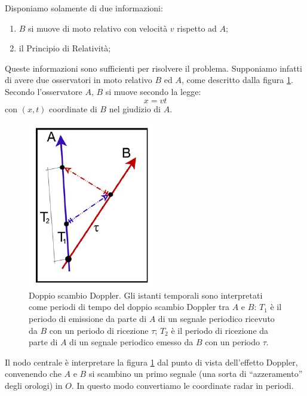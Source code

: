 Disponiamo solamente di due informazioni:
\begin{enumerate}
 \item $B$ si muove di moto relativo con velocità $v$ rispetto ad $A$;
 \item il Principio di Relatività;
\end{enumerate}
Queste informazioni sono sufficienti per risolvere il problema. 
Supponiamo infatti di avere due osservatori in moto relativo $B$ ed 
$A$, come descritto dalla figura \ref{doppler}. Secondo l'osservatore
$A$, $B$ si muove secondo la legge:
\begin{equation}\label{moto_relativo}
x=vt 
\end{equation}
con $(x, t)$ coordinate di $B$ nel giudizio di $A$.

\begin{figure}[htbp]
   \centering
   \includegraphics[scale=1]{immagini/minkowski/doppler}
   \caption{\label{doppler} Doppio scambio Doppler. Gli istanti temporali 
sono interpretati come periodi di tempo del doppio scambio Doppler
tra $A$ e $B$: $T_1$ è il periodo di emissione da parte di $A$ di un segnale periodico
ricevuto da $B$ con un periodo di ricezione $\tau$; $T_2$ è il periodo di ricezione da
parte di $A$ di un segnale periodico emesso da $B$ con un periodo $\tau$.}
\end{figure}

Il nodo centrale è interpretare la figura \ref{doppler} dal punto di vista dell'effetto
Doppler, convenendo che $A$ e $B$ si scambino un primo segnale (una sorta di
``azzeramento'' degli orologi) in $O$. In questo modo convertiamo le coordinate
radar in periodi.

